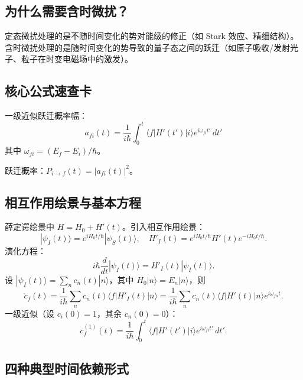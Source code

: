 \subsection{为什么需要含时微扰？}

定态微扰处理的是不随时间变化的势对能级的修正（如 Stark 效应、精细结构）。含时微扰处理的是随时间变化的势导致的量子态之间的跃迁（如原子吸收/发射光子、粒子在时变电磁场中的激发）。

\subsection{核心公式速查卡}

\begin{cheatbox}[核心公式速查卡]
一级近似跃迁概率幅：
\[
a_{fi}(t) = \frac{1}{i\hbar} \int_0^t \langle f|H'(t')|i\rangle e^{i\omega_{fi}t'} \, dt'
\]
其中 $\omega_{fi} = (E_f - E_i)/\hbar$。

跃迁概率：$P_{i\to f}(t) = |a_{fi}(t)|^2$。
\end{cheatbox}

\subsection{相互作用绘景与基本方程}

\begin{derivationbox}[相互作用绘景与基本方程]
薛定谔绘景中 $H = H_0 + H'(t)$。引入相互作用绘景：
\[
|\psi_I(t)\rangle = e^{iH_0 t/\hbar} |\psi_S(t)\rangle, \quad H'_I(t) = e^{iH_0 t/\hbar} H'(t) e^{-iH_0 t/\hbar}.
\]
演化方程：
\[
i\hbar \frac{d}{dt}|\psi_I(t)\rangle = H'_I(t) |\psi_I(t)\rangle.
\]
设 $|\psi_I(t)\rangle = \sum_n c_n(t)|n\rangle$，其中 $H_0|n\rangle = E_n|n\rangle$，则
\[
\dot{c}_f(t) = \frac{1}{i\hbar} \sum_n c_n(t) \langle f|H'_I(t)|n\rangle = \frac{1}{i\hbar} \sum_n c_n(t) \langle f|H'(t)|n\rangle e^{i\omega_{fn}t}.
\]
一级近似（设 $c_i(0)=1$，其余 $c_n(0)=0$）：
\[
c_f^{(1)}(t) = \frac{1}{i\hbar} \int_0^t \langle f|H'(t')|i\rangle e^{i\omega_{fi}t'} \, dt'.
\]
\end{derivationbox}

\subsection{四种典型时间依赖形式}

